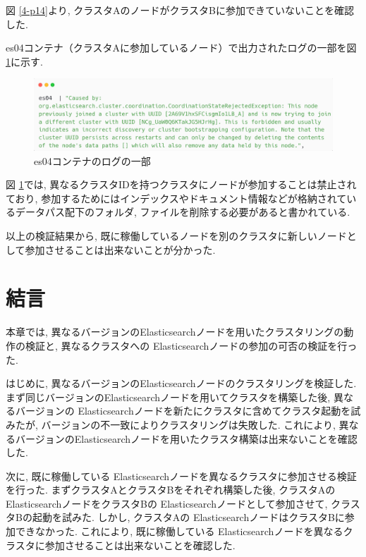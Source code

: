 図 \ref{4-p14}より, クラスタAのノードがクラスタBに参加できていないことを確認した.

es04コンテナ（クラスタAに参加しているノード）で出力されたログの一部を図 \ref{4-p15}に示す.

\begin{figure}[H]
  \begin{center}
    \includegraphics[width=140mm]{sotu/figure/es04-log.png}
    \caption{es04コンテナのログの一部}
    \label{4-p15}
  \end{center}
\end{figure}

図 \ref{4-p15}では, 異なるクラスタIDを持つクラスタにノードが参加することは禁止されており, 参加するためにはインデックスやドキュメント情報などが格納されているデータパス配下のフォルダ, ファイルを削除する必要があると書かれている.

以上の検証結果から, 既に稼働しているノードを別のクラスタに新しいノードとして参加させることは出来ないことが分かった.

\section{結言}
本章では, 異なるバージョンのElasticsearchノードを用いたクラスタリングの動作の検証と, 異なるクラスタへの Elasticsearchノードの参加の可否の検証を行った.

はじめに, 異なるバージョンのElasticsearchノードのクラスタリングを検証した. まず同じバージョンのElasticsearchノードを用いてクラスタを構築した後, 異なるバージョンの Elasticsearchノードを新たにクラスタに含めてクラスタ起動を試みたが, バージョンの不一致によりクラスタリングは失敗した. これにより, 異なるバージョンのElasticsearchノードを用いたクラスタ構築は出来ないことを確認した.

次に, 既に稼働している Elasticsearchノードを異なるクラスタに参加させる検証を行った. まずクラスタAとクラスタBをそれぞれ構築した後, クラスタAの ElasticsearchノードをクラスタBの Elasticsearchノードとして参加させて, クラスタBの起動を試みた. しかし, クラスタAの ElasticsearchノードはクラスタBに参加できなかった. これにより, 既に稼働している Elasticsearchノードを異なるクラスタに参加させることは出来ないことを確認した.

